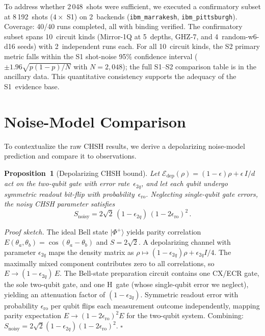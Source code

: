 \documentclass[aps,prxquantum,twocolumn,superscriptaddress,amsmath,amssymb,longbibliography,floatfix]{revtex4-2}
\begin{document}
To address whether 2\,048~shots were sufficient, we executed a confirmatory subset at 8\,192~shots ($4\times$ S1) on 2~backends (\texttt{ibm\_marrakesh}, \texttt{ibm\_pittsburgh}). Coverage: 40/40 runs completed, all with binding verified. The confirmatory subset spans 10~circuit kinds (Mirror-1Q at 5~depths, GHZ-7, and 4~random-w6-d16 seeds) with 2~independent runs each. For all 10~circuit kinds, the S2 primary metric falls within the S1 shot-noise 95\% confidence interval ($\pm 1.96\sqrt{p(1{-}p)/N}$ with $N{=}2{,}048$); the full S1--S2 comparison table is in the ancillary data. This quantitative consistency supports the adequacy of the S1~evidence base.

\section{Noise-Model Comparison}
\label{sec:noisemodel}

To contextualize the raw CHSH results, we derive a depolarizing noise-model prediction and compare it to observations.

\textbf{Proposition~1} (Depolarizing CHSH bound). \emph{Let $\mathcal{E}_{\text{dep}}(\rho) = (1-\epsilon)\rho + \epsilon \, I/d$ act on the two-qubit gate with error rate~$\epsilon_{2q}$, and let each qubit undergo symmetric readout bit-flip with probability~$\epsilon_{\text{ro}}$. Neglecting single-qubit gate errors, the noisy CHSH parameter satisfies}
\begin{equation}
  S_{\text{noisy}} = 2\sqrt{2} \, (1 - \epsilon_{2q}) \, (1 - 2\epsilon_{\text{ro}})^2\,.
  \label{eq:noisemodel}
\end{equation}

\emph{Proof sketch.} The ideal Bell state $|\Phi^+\rangle$ yields parity correlation $E(\theta_a, \theta_b) = \cos(\theta_a - \theta_b)$ and $S = 2\sqrt{2}$. A depolarizing channel with parameter $\epsilon_{2q}$ maps the density matrix as $\rho \mapsto (1-\epsilon_{2q})\rho + \epsilon_{2q} I/4$. The maximally mixed component contributes zero to all correlations, so $E \to (1-\epsilon_{2q})\, E$. The Bell-state preparation circuit contains one CX/ECR gate, the sole two-qubit gate, and one H~gate (whose single-qubit error we neglect), yielding an attenuation factor of $(1-\epsilon_{2q})$. Symmetric readout error with probability $\epsilon_{\text{ro}}$ per qubit flips each measurement outcome independently, mapping parity expectation $E \to (1-2\epsilon_{\text{ro}})^2 E$ for the two-qubit system. Combining: $S_{\text{noisy}} = 2\sqrt{2}(1-\epsilon_{2q})(1-2\epsilon_{\text{ro}})^2$. \hfill$\square$
\end{document}
